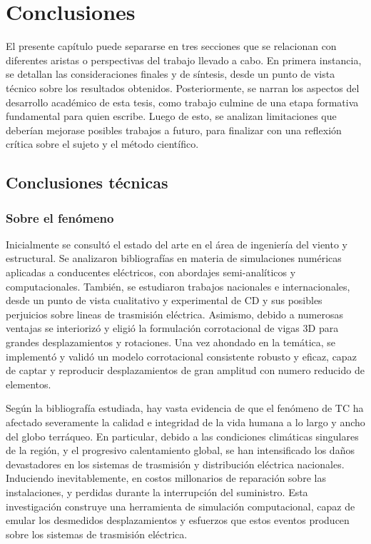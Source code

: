 \chapter{Conclusiones}\label{Cap:Conlcusiones}
\linenumbers

El presente capítulo puede separarse en tres secciones que se relacionan con diferentes aristas o perspectivas del trabajo llevado a cabo. En primera instancia, se detallan las consideraciones finales y de síntesis, desde un punto de vista técnico sobre los resultados obtenidos. Posteriormente, se narran los aspectos del desarrollo académico de esta tesis, como trabajo culmine de una etapa formativa fundamental para quien escribe. Luego de esto, se analizan limitaciones que deberían mejorase posibles trabajos a futuro, para finalizar con una reflexión crítica sobre el sujeto y el método científico. 

\section{Conclusiones técnicas}

\subsection{Sobre el fenómeno}

Inicialmente se consultó el estado del arte en el área de ingeniería del viento y estructural. Se analizaron bibliografías en materia de simulaciones numéricas aplicadas a conducentes eléctricos, con abordajes semi-analíticos y computacionales. También, se estudiaron trabajos nacionales e internacionales, desde un punto de vista cualitativo y experimental de CD y sus posibles perjuicios sobre lineas de trasmisión eléctrica.  Asimismo, debido a numerosas ventajas se interiorizó y eligió la formulación corrotacional de vigas 3D para grandes desplazamientos y rotaciones. Una vez ahondado en la temática, se implementó y validó un modelo corrotacional consistente robusto y eficaz, capaz de captar y reproducir desplazamientos de gran amplitud con numero reducido de elementos.

Según la bibliografía estudiada, hay vasta evidencia de que el fenómeno de \gls{TC} ha afectado severamente la calidad e integridad de la vida humana a lo largo y ancho del globo terráqueo. En particular, debido a las condiciones climáticas singulares de la región, y el progresivo calentamiento global, se han intensificado los daños devastadores en los sistemas de trasmisión y distribución eléctrica nacionales. Induciendo inevitablemente, en costos millonarios de reparación sobre las instalaciones, y perdidas durante la interrupción del suministro. Esta investigación construye una herramienta de simulación computacional, capaz de emular los desmedidos desplazamientos y esfuerzos que estos eventos producen sobre los sistemas de trasmisión eléctrica.

